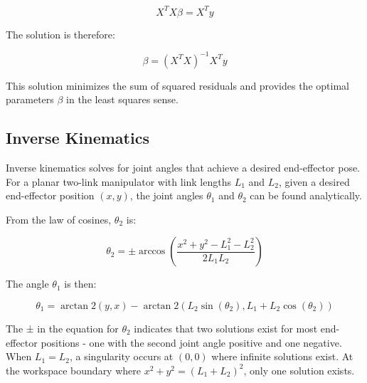 \[
X^TX\beta = X^Ty
\]

The solution is therefore:

\[
\beta = (X^TX)^{-1}X^Ty
\]

This solution minimizes the sum of squared residuals and provides the optimal parameters \(\beta\) in the least squares sense.

\subsection{Inverse Kinematics}
Inverse kinematics solves for joint angles that achieve a desired end-effector pose. For a planar two-link manipulator with link lengths \(L_1\) and \(L_2\), given a desired end-effector position \((x,y)\), the joint angles \(\theta_1\) and \(\theta_2\) can be found analytically.

From the law of cosines, \(\theta_2\) is:

\[
\theta_2 = \pm \arccos\left(\frac{x^2 + y^2 - L_1^2 - L_2^2}{2L_1L_2}\right)
\]

The angle \(\theta_1\) is then:

\[
\theta_1 = \arctan2(y,x) - \arctan2(L_2\sin(\theta_2), L_1 + L_2\cos(\theta_2))
\]

The ± in the equation for \(\theta_2\) indicates that two solutions exist for most end-effector positions - one with the second joint angle positive and one negative. When \(L_1 = L_2\), a singularity occurs at \((0,0)\) where infinite solutions exist. At the workspace boundary where \(x^2 + y^2 = (L_1 + L_2)^2\), only one solution exists.


